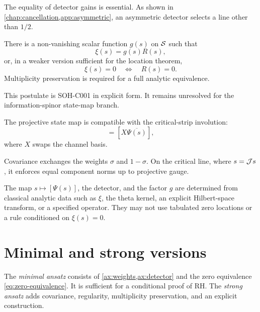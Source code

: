 The equality of detector gains is essential. As shown in \cref{chap:cancellation,app:asymmetric}, an asymmetric detector selects a line other than $1/2$.

\begin{postulate}
\label{post:zero-equivalence}
There is a non-vanishing scalar function $g(s)$ on $\mathcal{S}$ such that
\begin{equation}
 \xi(s)=g(s)R(s),
 \label{eq:zero-factorization}
\end{equation}
or, in a weaker version sufficient for the location theorem,
\begin{equation}
 \xi(s)=0\quad\Longleftrightarrow\quad R(s)=0.
 \label{eq:zero-equivalence}
\end{equation}
Multiplicity preservation is required for a full analytic equivalence.
\end{postulate}

This postulate is SOH-C001 in explicit form. It remains unresolved for the information-spinor state-map branch.

\begin{axiom}
\label{ax:covariance}
The projective state map is compatible with the critical-strip involution:
\begin{equation}
 [\Psi(\J s)]=[X\overline{\Psi(s)}],
 \label{eq:ansatz-covariance}
\end{equation}
where $X$ swaps the channel basis.
\end{axiom}

Covariance exchanges the weights $\sigma$ and $1-\sigma$. On the critical line, where $s=\mathcal{J} s$, it enforces equal component norms up to projective gauge.

\begin{axiom}
\label{ax:canonical}
The map $s\mapsto[\Psi(s)]$, the detector, and the factor $g$ are determined from classical analytic data such as $\xi$, the theta kernel, an explicit Hilbert-space transform, or a specified operator. They may not use tabulated zero locations or a rule conditioned on $\xi(s)=0$.
\end{axiom}

\section{Minimal and strong versions}

The \emph{minimal ansatz} consists of \cref{ax:weights,ax:detector} and the zero equivalence \cref{eq:zero-equivalence}. It is sufficient for a conditional proof of RH. The \emph{strong ansatz} adds covariance, regularity, multiplicity preservation, and an explicit construction.


